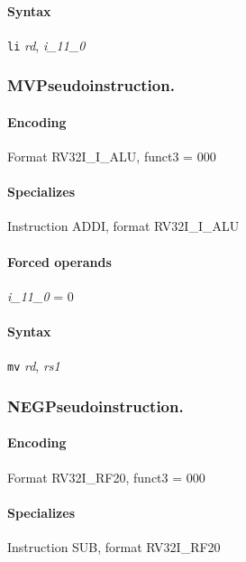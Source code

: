{\paragraph{Syntax} \texttt{li} \emph{rd}, \emph{i\_11\_0}
\newpage
\subsubsection[{\small MV: Pseudoinstruction.}]{MV\hfill Pseudoinstruction.}
\label{instr:MV}

\paragraph{Encoding} Format \textsf{RV32I\_I\_ALU, funct3 = 000}\\



\paragraph{Specializes} Instruction ADDI, format RV32I\_I\_ALU

\paragraph{Forced operands} \emph{i\_11\_0} = 0

\paragraph{Syntax} \texttt{mv} \emph{rd}, \emph{rs1}
\newpage
\subsubsection[{\small NEG: Pseudoinstruction.}]{NEG\hfill Pseudoinstruction.}
\label{instr:NEG}

\paragraph{Encoding} Format \textsf{RV32I\_RF20, funct3 = 000}\\



\paragraph{Specializes} Instruction SUB, format RV32I\_RF20

}
